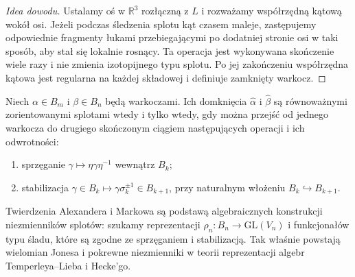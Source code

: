 \begin{proof}[Idea dowodu]
Ustalamy oś w $\mathbb R^3$ rozłączną z $L$ i rozważamy
współrzędną kątową wokół osi. Jeżeli podczas śledzenia splotu
kąt czasem maleje, zastępujemy odpowiednie fragmenty łukami
przebiegającymi po dodatniej stronie osi w taki sposób,
aby stał się lokalnie rosnący. Ta operacja jest wykonywana
skończenie wiele razy i nie zmienia izotopijnego typu splotu.
Po jej zakończeniu współrzędna kątowa jest regularna
na każdej składowej i definiuje zamknięty warkocz.
\end{proof}

\begin{twierdzenie}[Markow]
Niech $\alpha\in B_m$ i $\beta\in B_n$ będą warkoczami.
Ich domknięcia $\widehat\alpha$ i $\widehat\beta$ są
równoważnymi zorientowanymi splotami wtedy i tylko wtedy,
gdy można przejść od jednego warkocza do drugiego skończonym
ciągiem następujących operacji i ich odwrotności:
\begin{enumerate}[label=(\roman*)]
\item sprzęganie $\gamma\mapsto\eta\gamma\eta^{-1}$ wewnątrz $B_k$;
\item stabilizacja $\gamma\in B_k\mapsto\gamma\sigma_k^{\pm1}
\in B_{k+1}$, przy naturalnym włożeniu $B_k\hookrightarrow B_{k+1}$.
\end{enumerate}
\end{twierdzenie}

\begin{uwaga}
Twierdzenia Alexandera i Markowa są podstawą algebraicznych
konstrukcji niezmienników splotów: szukamy reprezentacji
$\rho_n\colon B_n\to\mathrm{GL}(V_n)$ i funkcjonałów typu
śladu, które są zgodne ze sprzęganiem i stabilizacją.
Tak właśnie powstają wielomian Jonesa i pokrewne niezmienniki
w teorii reprezentacji algebr Temperleya--Lieba i Hecke'go.
\end{uwaga}

